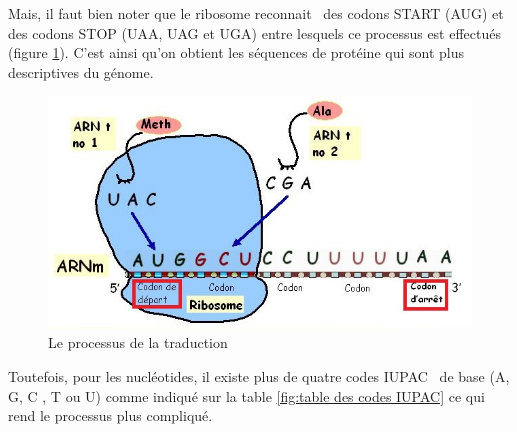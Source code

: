 \documentclass[12pt]{article}
\begin{document}
Mais, il faut bien noter que le ribosome reconnait~\cite{synth} des codons START (AUG) et des codons STOP (UAA, UAG et UGA) entre lesquels ce processus est effectués (figure \ref{fig:Le processus de traduction}). C'est ainsi qu'on obtient les séquences de protéine qui sont plus descriptives du génome.\\

\newpage

        \begin{figure}[!h]
             \centering
             \includegraphics[scale = 0.7]{Images/Codons/traduction.jpg}
             \caption{Le processus de la traduction}
             \label{fig:Le processus de traduction}
        \end{figure}
        

Toutefois, pour les nucléotides, il existe plus de quatre codes IUPAC~\cite{nucl}  de base (A, G, C , T ou U) comme indiqué sur la table \ref{fig:table des codes IUPAC} ce qui rend le processus plus compliqué.\\
\end{document}
